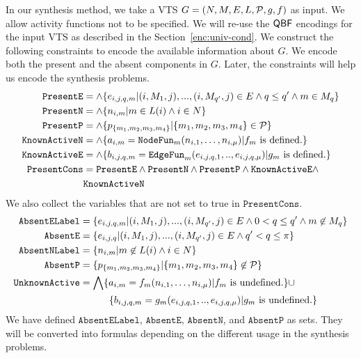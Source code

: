 In our synthesis method, we take a VTS $G =
(N,M,E,L,\mathcal{P},g,f)$ as input.
%
We allow activity functions not to be specified.
%
We will re-use the $\mathsf{QBF}$ encodings for the input VTS as described in the Section~\ref{enc:univ-cond}.
%
We construct the following constraints to encode the available information
about $G$.
%
We encode both the present and the absent components in $G$.
%
Later, the constraints will help us encode the synthesis problems.
%
\begin{align*}
\texttt{PresentE} &= \land \{e_{i,j,q,m}|(i,M_1,j),...,(i,M_{q'},j) \in E \land q \leq q' \land m \in M_q \}\\
\texttt{PresentN} &= \land \{n_{i,m}| m \in L(i) \land i \in N \}\\
\texttt{PresentP} &= \land \{p_{\{m_1,m_2,m_3,m_4\}}| \{m_1,m_2,m_3,m_4\} \in \mathcal{P} \} \\
\texttt{KnownActiveN} &= \land \{ a_{i,m} = \texttt{NodeFun}_m (n_{i,1},\dots,n_{i,\mu}) | f_m \text{ is defined.} \} \\
\texttt{KnownActiveE} &= \land \{ b_{i,j,q,m} = \texttt{EdgeFun}_m(e_{i,j,q,1}, .., e_{i,j,q,\mu})
| g_m \text{ is defined.} \} \\
\texttt{PresentCons} & = \texttt{PresentE} \land \texttt{PresentN} \land 
\texttt{PresentP} \land \texttt{KnownActiveE} \land \\
&  \texttt{KnownActiveN}
\end{align*}
We also collect the variables that are not set to true in $\texttt{PresentCons}$.
\begin{align*}
\texttt{AbsentELabel} &=
\{e_{i,j,q,m}|(i,M_1,j),...,(i,M_{q'},j) \in E \land 
0 < q \leq q' \land m \not\in M_{q} \}\\
\texttt{AbsentE} &= \{e_{i,j,q}|(i,M_1,j),...,(i,M_{q'},j) \in E \land 
q' < q \leq \pi \}\\
\texttt{AbsentNLabel} &= \{n_{i,m}| m \not\in L(i) \land i \in N \}\\
\texttt{AbsentP} &= \{p_{\{m_1,m_2,m_3,m_4\}}| {\{m_1,m_2,m_3,m_4\}} \not\in \mathcal{P} \} \\
\texttt{UnknownActive} &=  \bigwedge \{ a_{i,m} = f_m (n_{i,1},\dots,n_{i,\mu}) | f_m \text{ is undefined.} \} {\cup} \\
&\quad\quad\quad  \{ b_{i,j,q,m} = g_m(e_{i,j,q,1}, .., e_{i,j,q,\mu})
| g_m \text{ is undefined.} \}
\end{align*}
We have defined $\texttt{AbsentELabel}$, $\texttt{AbsentE}$, $\texttt{AbsentN}$, and
$\texttt{AbsentP}$
as sets.
%
They will be converted into formulas depending
on the different usage in the synthesis problems. 

